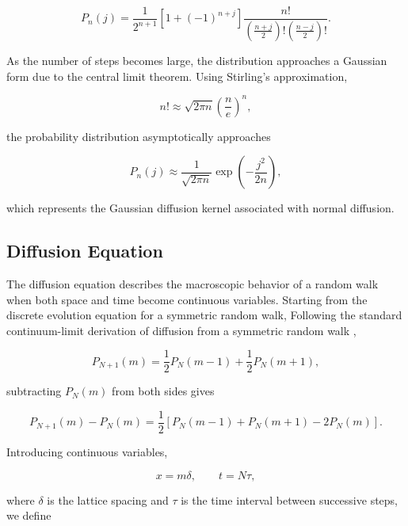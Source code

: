 \begin{equation}
P_n(j)
=
\frac{1}{2^{n+1}}
\left[
1+(-1)^{n+j}
\right]
\frac{n!}{
\left(
\frac{n+j}{2}
\right)!
\left(
\frac{n-j}{2}
\right)!
}.
\end{equation}

As the number of steps becomes large\cite{klafter2011}, the distribution approaches a Gaussian form due to the central limit theorem. Using Stirling's approximation,

\begin{equation}
n! \approx \sqrt{2\pi n}\left(\frac{n}{e}\right)^n,
\end{equation}

the probability distribution asymptotically approaches

\begin{equation}
P_n(j)
\approx
\frac{1}{\sqrt{2\pi n}}
\exp\left(
-\frac{j^2}{2n}
\right),
\end{equation}

which represents the Gaussian diffusion kernel associated with normal diffusion.

\subsection{Diffusion Equation}

The diffusion equation describes the macroscopic behavior of a random walk\cite{klafter2011,mcb111_diffusion} when both space and time become continuous variables. Starting from the discrete evolution equation for a symmetric random walk,
Following the standard continuum-limit derivation of diffusion from a symmetric random walk
\cite{klafter2011,mcb111_diffusion},

\begin{equation}
P_{N+1}(m)
=
\frac{1}{2}P_N(m-1)
+
\frac{1}{2}P_N(m+1),
\end{equation}

subtracting $P_N(m)$ from both sides gives

\begin{equation}
P_{N+1}(m)-P_N(m)
=
\frac{1}{2}
\left[
P_N(m-1)+P_N(m+1)-2P_N(m)
\right].
\end{equation}

Introducing continuous variables,

\begin{equation}
x=m\delta,
\qquad
t=N\tau,
\end{equation}

where $\delta$ is the lattice spacing and $\tau$ is the time interval between successive steps, we define

